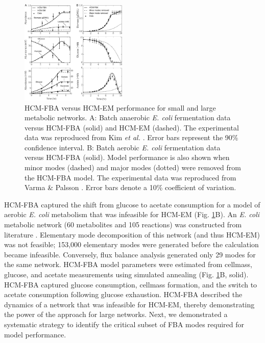 \documentclass[10pt,twocolumn,twoside,final]{IEEEtran}
\begin{document}
\begin{figure}[!t]\centering
\includegraphics[width=0.45\textwidth]{./figs/Fig-2-Ecoli-SimulationResults.pdf}
\caption{HCM-FBA versus HCM-EM performance for small and large metabolic networks.
A: Batch anaerobic \textit{E. coli} fermentation data versus HCM-FBA (solid) and HCM-EM (dashed).
The experimental data was reproduced from Kim \textit{et al.} \cite{2008_kim_varner_ramkrishna_BiotechProg}. Error bars represent the 90\% confidence interval.
B: Batch aerobic \textit{E. coli} fermentation data versus HCM-FBA (solid).
Model performance is also shown when minor modes (dashed) and major modes (dotted) were removed from the HCM-FBA model.
The experimental data was reproduced from Varma \& Palsson \cite{1994_varma_palsson_ApplEnvMicro}. Error bars denote a 10\% coefficient of variation.}
\label{fig:ecoli}
\end{figure}

HCM-FBA captured the shift from glucose to acetate consumption for a model of aerobic \textit{E. coli} metabolism that was infeasible for HCM-EM (Fig. \ref{fig:ecoli}B).
An \emph{E. coli} metabolic network (60 metabolites and 105 reactions) was constructed from literature \cite{2007_schuetz_etal_MolSysBio,2006_Palsson_model}.
Elementary mode decomposition of this network (and thus HCM-EM) was not feasible; 153,000 elementary modes were generated before the calculation became infeasible.
Conversely, flux balance analysis generated only 29 modes for the same network.
HCM-FBA model parameters were estimated from cellmass, glucose, and acetate measurements \cite{1994_varma_palsson_ApplEnvMicro} using simulated annealing (Fig. \ref{fig:ecoli}B, solid).
HCM-FBA captured glucose consumption, cellmass formation, and the switch to acetate consumption following glucose exhaustion.
HCM-FBA described the dynamics of a network that was infeasible for HCM-EM, thereby demonstrating the power of the approach for large networks.
Next, we demonstrated a systematic strategy to identify the critical subset of FBA modes required for model performance.
\end{document}
